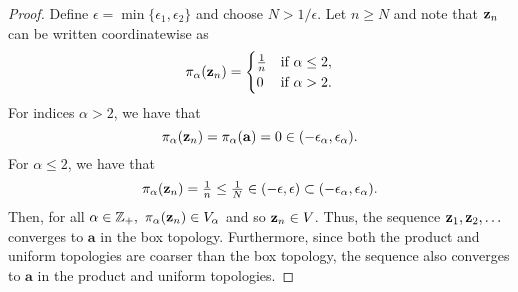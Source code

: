 \begin{solution}
\begin{proof}
        Define $\epsilon = \min\{\epsilon_1, \epsilon_2\}$ and choose $N > 1 / \epsilon$.
        Let $n \geq N$ and note that $\mathbf{z}_n$ can be written coordinatewise as
        \begin{equation*}
            \pi_\alpha(\mathbf{z}_n) = \begin{cases}
                \tfrac{1}{n}    & \text{if } \alpha \leq 2, \\
                0               & \text{if } \alpha > 2.
            \end{cases}
        \end{equation*}
        For indices $\alpha > 2$, we have that
        \begin{equation*}
            \pi_\alpha(\mathbf{z}_n) = \pi_\alpha(\mathbf{a}) = 0 \in (-\epsilon_\alpha, \epsilon_\alpha).
        \end{equation*}
        For $\alpha \leq 2$, we have that
        \begin{equation*}
            \pi_\alpha(\mathbf{z}_n) = \tfrac{1}{n} \leq \tfrac{1}{N} \in (-\epsilon, \epsilon) \subset (-\epsilon_\alpha, \epsilon_\alpha).
        \end{equation*}
        Then, for all $\alpha \in \mathbb{Z}_+,~ \pi_\alpha(\mathbf{z}_n) \in V_\alpha$ and so $\mathbf{z}_n \in V$.
        Thus, the sequence $\mathbf{z}_1, \mathbf{z}_2, \ldots$ converges to $\mathbf{a}$ in the box topology.
        Furthermore, since both the product and uniform topologies are coarser than the box topology, the sequence also converges to $\mathbf{a}$ in the product and uniform topologies.
    \end{proof}
\end{solution}
\newpage